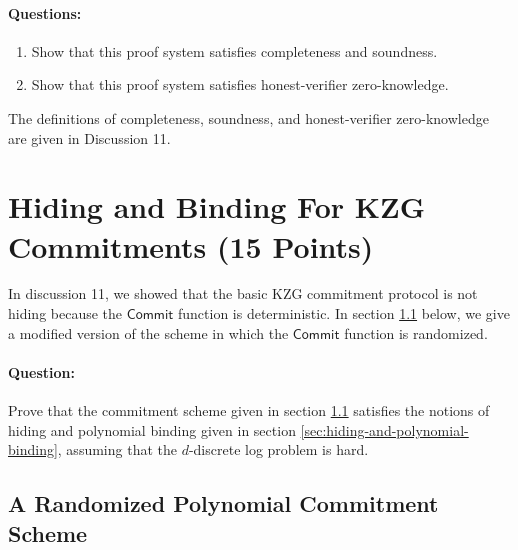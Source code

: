 \documentclass[11pt]{article}
\numberwithin{equation}{section}
\begin{document}
\paragraph{Questions:} 
\begin{enumerate}
    \item Show that this proof system satisfies completeness and soundness.
    \item Show that this proof system satisfies honest-verifier zero-knowledge.
\end{enumerate}

The definitions of completeness, soundness, and honest-verifier zero-knowledge are given in Discussion 11.
\pagebreak


\section{Hiding and Binding For KZG Commitments (15 Points)}
In discussion 11, we showed that the basic KZG commitment protocol is not hiding because the $\mathsf{Commit}$ function is deterministic. In section \ref{sec:randomized-KZG-commitment-construction} below, we give a modified version of the scheme in which the $\mathsf{Commit}$ function is randomized.

\paragraph{Question:} Prove that the commitment scheme given in section \ref{sec:randomized-KZG-commitment-construction} satisfies the notions of hiding and polynomial binding given in section \ref{sec:hiding-and-polynomial-binding}, assuming that the $d$-discrete log problem is hard.

\subsection{A Randomized Polynomial Commitment Scheme}\label{sec:randomized-KZG-commitment-construction}
\end{document}
